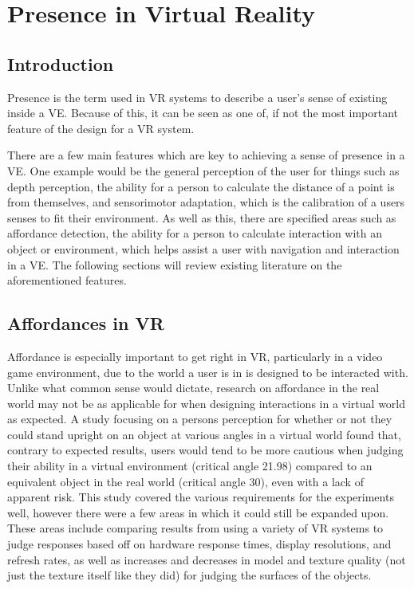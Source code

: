 \section{Presence in Virtual Reality}
\label{lr:vr}

	
	\subsection{Introduction}
	\label{lr:vr:intro}
		Presence is the term used in VR systems to describe a user's sense of existing inside a VE. Because of this, it can be seen as one of, if not the most important feature of the design for a VR system.
		
		There are a few main features which are key to achieving a sense of presence in a VE. One example would be the general perception of the user for things such as depth perception, the ability for a person to calculate the distance of a point is from themselves, and sensorimotor adaptation, which is the calibration of a users senses to fit their environment. 
		As well as this, there are specified areas such as affordance detection, the ability for a person to calculate interaction with an object or environment, which helps assist a user with navigation and interaction in a VE. 
		The following sections will review existing literature on the aforementioned features.
	
	\subsection{Affordances in VR}
	\label{lr:vr:affordances}
		Affordance is especially important to get right in VR, particularly in a video game environment, due to the world a user is in is designed to be interacted with. Unlike what common sense would dictate, research on affordance in the real world may not be as applicable for when designing interactions in a virtual world as expected. A study \cite{Regia-Corte2012} focusing on a persons perception for whether or not they could stand upright on an object at various angles in a virtual world found that, contrary to expected results, users would tend to be more cautious when judging their ability in a virtual environment (critical angle 21.98\degree) compared to an equivalent object in the real world (critical angle 30\degree), even with a lack of apparent risk. 
		This study covered the various requirements for the experiments well, however there were a few areas in which it could still be expanded upon. These areas include comparing results from using a variety of VR systems to judge responses based off on hardware response times, display resolutions, and refresh rates, as well as increases and decreases in model and texture quality (not just the texture itself like they did) for judging the surfaces of the objects.
		
